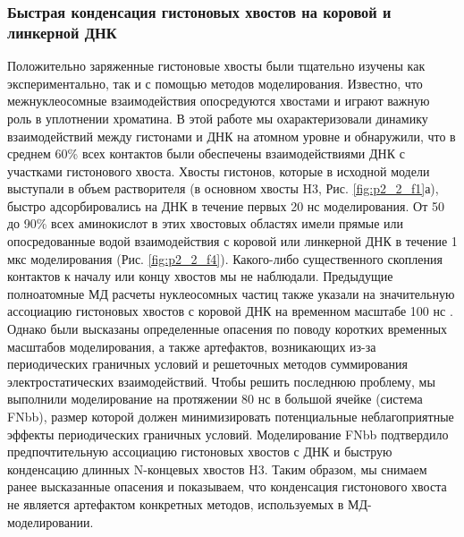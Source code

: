 \subsubsection{Быстрая конденсация гистоновых хвостов на коровой и линкерной ДНК}
    Положительно заряженные гистоновые хвосты были тщательно изучены как экспериментально, так и с помощью методов моделирования. Известно, что межнуклеосомные взаимодействия опосредуются хвостами и играют важную роль в уплотнении хроматина. В этой работе мы охарактеризовали динамику взаимодействий между гистонами и ДНК на атомном уровне и обнаружили, что в среднем 60\% всех контактов были обеспечены взаимодействиями ДНК с участками гистонового хвоста. Хвосты гистонов, которые в исходной модели выступали в объем растворителя (в основном хвосты H3, Рис. \ref{fig:p2_2_f1}а), быстро адсорбировались на ДНК в течение первых 20 нс моделирования. От 50 до 90\% всех аминокислот в этих хвостовых областях имели прямые или опосредованные водой взаимодействия с коровой или линкерной ДНК в течение 1 мкс моделирования (Рис. \ref{fig:p2_2_f4}). Какого-либо существенного скопления контактов к началу или концу хвостов мы не наблюдали. Предыдущие полноатомные МД расчеты нуклеосомных частиц также указали на значительную ассоциацию гистоновых хвостов с коровой ДНК на временном масштабе 100 нс \cite{erler_role_2014,biswas_role_2011,roccatano_structural_2007}. Однако были высказаны определенные опасения по поводу коротких временных масштабов моделирования, а также артефактов, возникающих из-за периодических граничных условий и решеточных методов суммирования электростатических взаимодействий. Чтобы решить последнюю проблему, мы выполнили моделирование на протяжении 80 нс в большой ячейке (система FNbb), размер которой должен минимизировать потенциальные неблагоприятные эффекты периодических граничных условий. Моделирование FNbb подтвердило предпочтительную ассоциацию гистоновых хвостов с ДНК и быструю конденсацию длинных N-концевых хвостов H3. Таким образом, мы снимаем ранее высказанные опасения и показываем, что конденсация гистонового хвоста не является артефактом конкретных методов, используемых в МД-моделировании.

